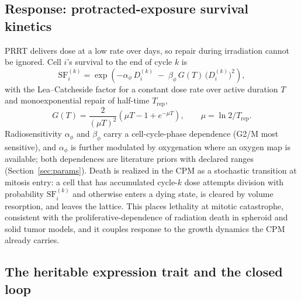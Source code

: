 \documentclass[11pt]{article}
\begin{document}
\subsection{Response: protracted-exposure survival kinetics}

PRRT delivers dose at a low rate over days, so repair during irradiation cannot be
ignored. Cell $i$'s survival to the end of cycle $k$ is
\begin{equation}
\mathrm{SF}^{(k)}_i = \exp\!\left( -\alpha_{\phi}\, D^{(k)}_i
\;-\; \beta_{\phi}\, G(T)\, \bigl(D^{(k)}_i\bigr)^2 \right),
\label{eq:sf}
\end{equation}
with the Lea--Catcheside factor for a constant dose rate over active duration $T$ and
monoexponential repair of half-time $T_{\text{rep}}$,
\begin{equation}
G(T) = \frac{2}{(\mu T)^2}\left( \mu T - 1 + e^{-\mu T} \right),
\qquad \mu = \ln 2 / T_{\text{rep}} .
\label{eq:lea}
\end{equation}
Radiosensitivity $\alpha_{\phi}$ and $\beta_{\phi}$ carry a cell-cycle-phase dependence
(G2/M most sensitive), and $\alpha_{\phi}$ is further modulated by oxygenation where an
oxygen map is available; both dependences are literature priors with declared ranges
(Section~\ref{sec:params}). Death is realized in the CPM as a stochastic transition at
mitosis entry: a cell that has accumulated cycle-$k$ dose attempts division with
probability $\mathrm{SF}^{(k)}_i$ and otherwise enters a dying state, is cleared by
volume resorption, and leaves the lattice. This places lethality at mitotic catastrophe,
consistent with the proliferative-dependence of radiation death in spheroid and solid
tumor models, and it couples response to the growth dynamics the CPM already carries.

\subsection{The heritable expression trait and the closed loop}
\end{document}
